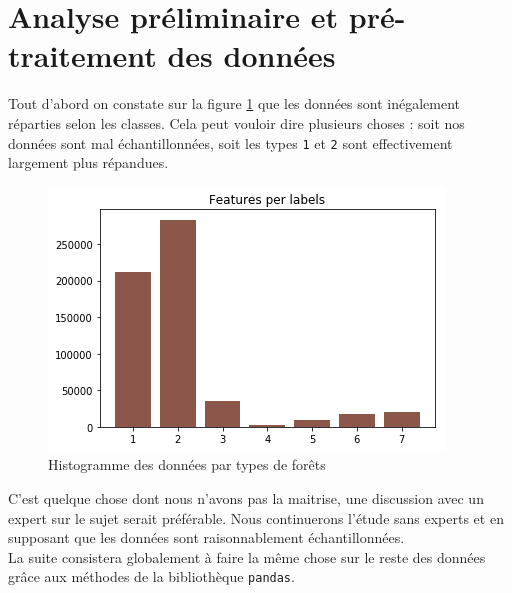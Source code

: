 \documentclass[12pt,a4paper]{article}
\numberwithin{equation}{section}
\begin{document}
	\section{Analyse préliminaire et pré-traitement des données}
	
	Tout d'abord on constate sur la figure \ref{fig:datahist} que les données sont inégalement réparties selon les classes. Cela peut vouloir dire plusieurs choses : soit nos données sont mal échantillonnées, soit les types \verb!1! et \verb!2! sont effectivement largement plus répandues.\\
	
	\begin{figure}
		\centering
		\includegraphics[width=1\linewidth]{img/data_hist}
		\caption{Histogramme des données par types de forêts}
		\label{fig:datahist}
	\end{figure}

	 C'est quelque chose dont nous n'avons pas la maitrise, une discussion avec un expert sur le sujet serait préférable. Nous continuerons l'étude sans experts et en supposant que les données sont raisonnablement échantillonnées.\\
	
	La suite consistera globalement à faire la même chose sur le reste des données grâce aux méthodes de la bibliothèque \verb!pandas!.\\
	
\end{document}
